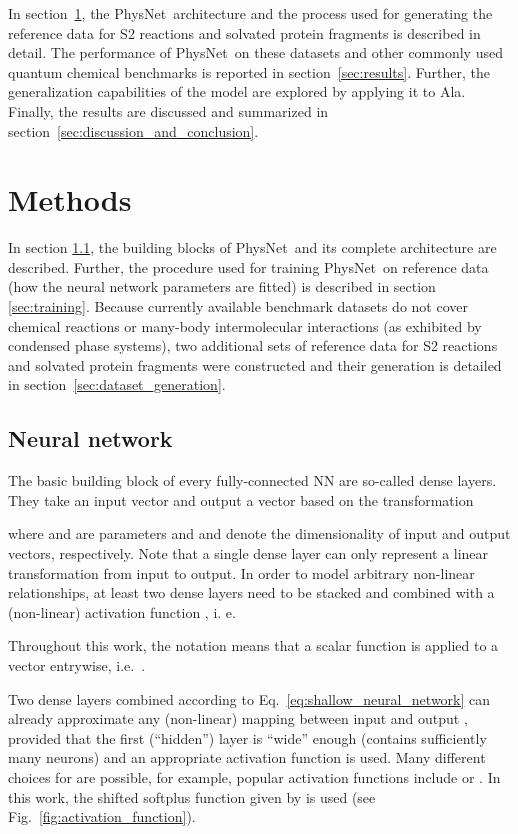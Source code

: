 \documentclass[12pt]{article}
\newcommand{\nn}{PhysNet}
\begin{document}
In section~\ref{sec:methods}, the \nn\ architecture and the process
used for generating the reference data for S2 reactions and
solvated protein fragments is described in detail. The performance of
\nn\ on these datasets and other commonly used quantum chemical
benchmarks is reported in section~\ref{sec:results}. Further, the
generalization capabilities of the model are explored by applying it
to Ala. Finally, the results are discussed and summarized in
section~\ref{sec:discussion_and_conclusion}.

\section{Methods}
\label{sec:methods}
In section \ref{sec:neural_network}, the building blocks of \nn\ and
its complete architecture are described. Further, the procedure used
for training \nn\ on reference data (how the neural network parameters
are fitted) is described in section \ref{sec:training}. Because
currently available benchmark datasets do not cover chemical reactions or many-body
intermolecular interactions (as exhibited by condensed phase systems), two additional sets of reference data for
S2 reactions and solvated protein fragments were constructed
and their generation is detailed in
section~\ref{sec:dataset_generation}.

\subsection{Neural network}
\label{sec:neural_network}

The basic building block of every fully-connected NN are so-called
dense layers. They take an input vector  and output a vector  based on the transformation

where  and
 are parameters and  and  denote the dimensionality of input and output
vectors, respectively. Note that a single dense layer can only
represent a linear transformation from input to output. In order to
model arbitrary non-linear relationships, at least two dense layers
need to be stacked and combined with a (non-linear) activation
function , i. e.

Throughout this work, the notation  means that a
scalar function  is applied to a vector 
entrywise, i.e.\ .

Two dense layers combined according to
Eq.~\ref{eq:shallow_neural_network} can already approximate any
(non-linear) mapping between input  and output
, provided that the first (``hidden'') layer is ``wide''
enough (contains sufficiently many neurons) and an appropriate
activation function  is
used.\cite{gybenko1989approximation} Many different choices for
 are possible,\cite{chen1995universal} for example, popular
activation functions include \cite{gybenko1989approximation}
or .\cite{hahnloser2000digital} In this work,
the shifted softplus function\cite{schutt2017schnet} given by
 is used
(see Fig.~\ref{fig:activation_function}).
\end{document}
